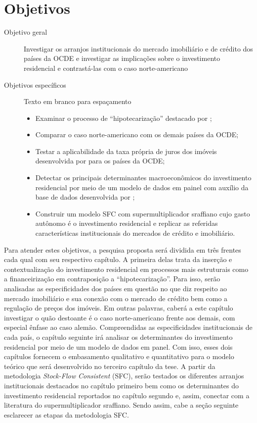\section{Objetivos}\label{OBJ}

\begin{description}
	\item[Objetivo geral] Investigar os arranjos institucionais do mercado imobiliário e de crédito dos países da OCDE e investigar as implicações sobre o investimento residencial e contrastá-las com o caso norte-americano
	\item[Objetivos específicos] {\color{white} Texto em branco para espaçamento}
	\begin{itemize}
		\item Examinar o processo de ``hipotecarização'' destacado por \textcite{jorda_great_2014};
		\item Comparar o caso norte-americano com os demais países da OCDE;
		\item Testar a aplicabilidade da taxa própria de juros dos imóveis desenvolvida por \textcite{teixeira_crescimento_2015} para os países da OCDE; 
		\item Detectar os principais determinantes macroeconômicos do investimento residencial por meio de um modelo de dados em painel com auxílio da base de dados desenvolvida por \textcite{jorda_great_2014};
		\item Construir um modelo SFC com supermultiplicador sraffiano cujo gasto autônomo é o investimento residencial e replicar as referidas características institucionais do mercados de crédito e imobiliário.
	\end{itemize}
\end{description}


Para atender estes objetivos, a pesquisa proposta será dividida em três frentes cada qual com seu respectivo capítulo.
A primeira delas trata da inserção e contextualização do investimento residencial em processos mais estruturais como a financeirização em contraposição a ``hipotecarização''. Para isso, serão analisadas as especificidades dos países em questão no que diz respeito ao mercado imobiliário e sua conexão com o mercado de crédito bem como a regulação de preços dos imóveis. Em outras palavras, caberá a este capítulo investigar o quão destoante é o caso norte-americano frente aos demais, com especial ênfase ao caso alemão. Compreendidas as especificidades institucionais de cada país, o capítulo seguinte irá analisar os determinantes do investimento residencial por meio de um modelo de dados em panel. Com isso, esses dois capítulos fornecem o embasamento qualitativo e quantitativo para o modelo teórico que será desenvolvido no terceiro capítulo da tese. A partir da metodologia \textit{Stock-Flow Consistent} (SFC), serão testados os diferentes arranjos institucionais destacados no capítulo primeiro bem como os determinantes do investimento residencial reportados no capítulo segundo e, assim, conectar com a literatura do supermultiplicador sraffiano. Sendo assim, cabe a seção seguinte esclarecer as etapas da metodologia SFC.
